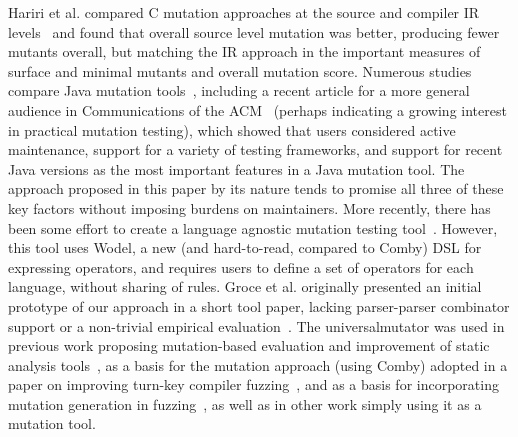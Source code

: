 \documentclass[acmsmall]{acmart}
\begin{document}
{Hariri et al. compared C mutation approaches at the source and
compiler IR levels~\cite{CompareSrcBinary} and found that overall
source level mutation was better, producing fewer mutants overall, but
matching the IR approach in the important measures of surface and
minimal mutants and overall mutation score.  Numerous studies compare
Java mutation tools~\cite{MajorPIT,gopinath2017does}, including a
recent article for a more general audience in Communications of the
ACM~\cite{CommACMJavaTool} (perhaps indicating a growing interest in
practical mutation testing), which showed that users
considered active maintenance, support for a variety of testing
frameworks, and support for recent Java versions as the most important
features in a Java mutation tool.  The approach proposed in this paper
by its nature tends to promise all three of these key factors without
imposing burdens on maintainers. More recently, there has been some effort to create a 
language agnostic mutation testing tool~\cite{wodeltest}.  However, this tool uses
Wodel, a new (and hard-to-read, compared to Comby) DSL for expressing operators, and requires users to
define a set of operators for each language, without sharing  
of rules.  Groce et al. originally presented an initial
  prototype of our approach in a short tool paper, lacking parser-parser combinator
  support or a non-trivial empirical evaluation~\cite{regexpMut}.  
  The universalmutator
  was used in previous work proposing mutation-based evaluation and
  improvement of static analysis tools~\cite{StatMut}, as a basis
  for the mutation approach (using Comby) adopted in a paper on
  improving turn-key compiler fuzzing~\cite{NoFuss}, and as a basis
  for incorporating mutation generation in fuzzing~\cite{FirstFuzz},
  as well as in other work simply using it as a mutation tool.


}
\end{document}
